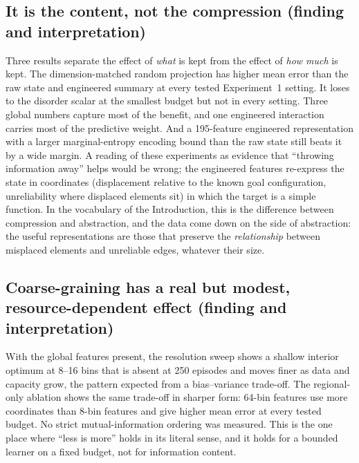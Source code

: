 \documentclass[11pt,a4paper]{article}
\begin{document}
\subsection{It is the content, not the compression (finding and interpretation)}
Three results separate the effect of \emph{what} is kept from the effect of
\emph{how much} is kept. The dimension-matched random projection has higher mean error than the raw
state and engineered summary at every tested Experiment~1 setting. It loses
to the disorder scalar at the smallest budget but not in every setting. Three
global numbers capture most of the benefit, and one engineered interaction
carries most of the predictive weight. And a 195-feature engineered
representation with a larger marginal-entropy encoding bound than the raw state still beats it by
a wide margin. A reading of these experiments as evidence that ``throwing
information away'' helps would be wrong; the engineered features re-express the
state in coordinates (displacement relative to the known goal configuration,
unreliability where displaced elements sit) in which the target is a simple
function. In the vocabulary of the Introduction, this is the difference between
compression and abstraction, and the data come down on the side of abstraction:
the useful representations are those that preserve the \emph{relationship}
between misplaced elements and unreliable edges, whatever their size.

\subsection{Coarse-graining has a real but modest, resource-dependent effect (finding and interpretation)}
With the global features present, the resolution sweep shows a shallow interior
optimum at 8--16 bins that is absent at 250 episodes and moves finer as data and
capacity grow, the pattern expected from a bias--variance trade-off. The
regional-only ablation shows the same trade-off in sharper form: 64-bin
features use more coordinates than 8-bin features and give higher mean error
at every tested budget. No strict mutual-information ordering was measured. This is the one place where ``less is more''
holds in its literal sense, and it holds for a bounded learner on a fixed
budget, not for information content.
\end{document}

